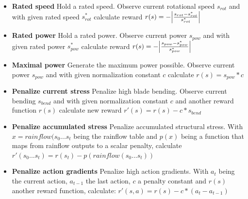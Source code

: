 \documentclass[hyperref,german,beleg]{cgvpub}
\begin{document}
\begin{itemize}

\item \textbf{Rated speed} Hold a rated speed. Observe current rotational speed \(s_{rot}\) and with given rated speed \(s^*_{rot}\) calculate reward \(r(s) = -\abs{\frac{s_{rot} - s^*_{rot}}{s^*_{rot}}}\)

\item \textbf{Rated power} Hold a rated power. Observe current power \(s_{pow}\) and with given rated power \(s^*_{pow}\) calculate reward \(r(s) = -\abs{\frac{s_{pow} - s^*_{pow}}{s^*_{pow}}}\)

\item \textbf{Maximal power} Generate the maximum power possible. Observe current power \(s_{pow}\) and with given normalization constant \(c\) calculate \(r(s) = s_{pow} * c\)

\item \textbf{Penalize current stress} Penalize high blade bending. Observe current bending \(s_{bend}\) and with given normalization constant \(c\) and another reward function \(r(s)\) calculate new reward \(r'(s) = r(s) - c * s_{bend} \)

\item \textbf{Penalize accumulated stress} Penalize accumulated structural stress. With \(x = rainflow(s_0...s_t\) being the rainflow table and \(p(x)\) being a function that maps from rainflow outputs to a scalar penalty, calculate \(r'(s_0...s_t) = r(s_t) - p(rainflow(s_0...s_t))\)

\item \textbf{Penalize action gradients} Penalize high action gradients. With \(a_t\) being the current action, \(a_{t-1}\) the last action, \(c\) a penalty constant and \(r(s)\) another reward function, calculate: \(r'(s, a) = r(s) - c * (a_t - a_{t-1})\)

\end{itemize}
\end{document}
